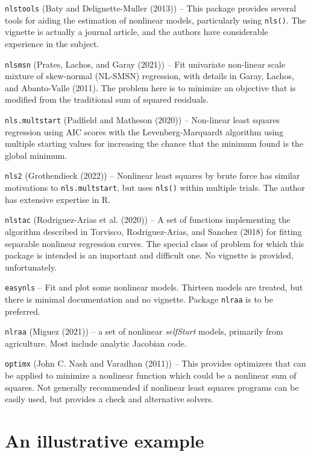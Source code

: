 \texttt{nlstools} (Baty and Delignette-Muller (2013)) -- This package provides several tools for aiding the estimation
of nonlinear models, particularly using \texttt{nls()}. The vignette is actually a journal
article, and the authors have considerable experience in the subject.

\texttt{nlsmsn} (Prates, Lachos, and Garay (2021)) -- Fit univariate non-linear scale mixture of skew-normal (NL-SMSN)
regression, with details in Garay, Lachos, and Abanto-Valle (2011). The problem
here is to minimize an objective that is modified from the traditional sum of squared
residuals.

\texttt{nls.multstart} (Padfield and Matheson (2020)) -- Non-linear least squares regression using
AIC scores with the Levenberg-Marquardt algorithm using multiple starting values
for increasing the chance that the minimum found is the global minimum.

\texttt{nls2} (Grothendieck (2022)) -- Nonlinear least squares by brute force has similar
motivations to \texttt{nls.multstart}, but uses \texttt{nls()} within multiple trials. The author
has extensive expertise in R.

\texttt{nlstac} (Rodriguez-Arias et al. (2020)) -- A set of functions implementing the algorithm described in
Torvisco, Rodriguez-Arias, and Sanchez (2018) for fitting separable nonlinear regression curves. The
special class of problem for which this package is intended is an important and
difficult one. No vignette is provided, unfortunately.

\texttt{easynls} -- Fit and plot some nonlinear models. Thirteen models are treated, but
there is minimal documentation and no vignette. Package \texttt{nlraa} is to be preferred.

\texttt{nlraa} (Miguez (2021)) -- a set of nonlinear \emph{selfStart} models, primarily from
agriculture. Most include analytic Jacobian code.

\texttt{optimx} (John C. Nash and Varadhan (2011)) -- This provides
optimizers that can be applied to minimize a nonlinear function which could be
a nonlinear sum of squares. Not generally recommended if nonlinear
least squares programs can be easily used, but provides a check and alternative
solvers.

\hypertarget{an-illustrative-example}{%
\section{An illustrative example}\label{an-illustrative-example}}


